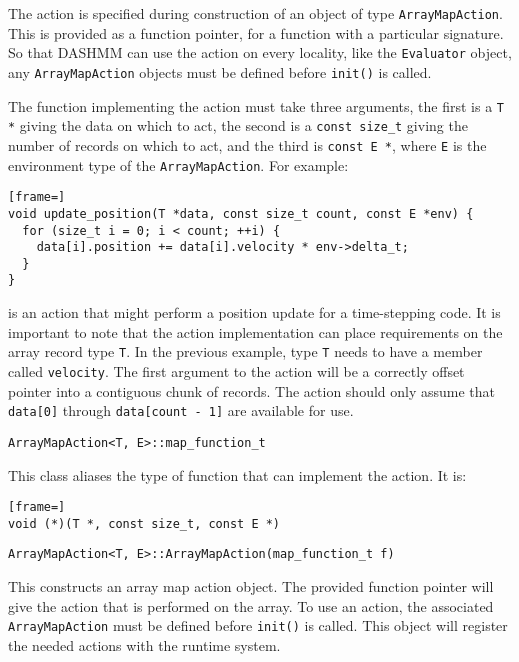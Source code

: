 The action is specified during construction of an object of type
\texttt{ArrayMapAction}. This is provided as a function pointer, for a function
with a particular signature. So that DASHMM can use the action on every
locality, like the \texttt{Evaluator} object, any \texttt{ArrayMapAction}
objects must be defined before \texttt{init()} is called.

The function implementing the action must take three arguments, the first is
a \texttt{T *} giving the data on which to act, the second is a
\texttt{const size\_t} giving the number of records on which to act, and the
third is \texttt{const E *}, where \texttt{E} is the environment type of the
\texttt{ArrayMapAction}. For example:

\begin{lstlisting}[frame=]
void update_position(T *data, const size_t count, const E *env) {
  for (size_t i = 0; i < count; ++i) {
    data[i].position += data[i].velocity * env->delta_t;
  }
}
\end{lstlisting}

\noindent is an action that might perform a position update for a
time-stepping code. It is important to note that the action implementation can
place requirements on the array record type \texttt{T}. In the previous
example, type \texttt{T} needs to have a member called \texttt{velocity}.
The first argument to the action will be a correctly offset pointer into a
contiguous chunk of records. The action should only assume that
\texttt{data[0]} through \texttt{data[count - 1]} are available for use.

\begin{lstlisting}
ArrayMapAction<T, E>::map_function_t
\end{lstlisting}

\noindent This class aliases the type of function that can implement the
action. It is:

\begin{lstlisting}[frame=]
void (*)(T *, const size_t, const E *)
\end{lstlisting}

\begin{lstlisting}
ArrayMapAction<T, E>::ArrayMapAction(map_function_t f)
\end{lstlisting}

\noindent This constructs an array map action object. The provided function
pointer
will give the action that is performed on the array. To use an action,
the associated \texttt{ArrayMapAction} must be defined before \texttt{init()} is
called. This object will register the needed actions with the runtime system.

